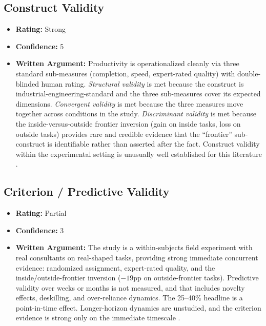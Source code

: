 \subsection{Construct Validity}
\begin{itemize}
    \item \textbf{Rating:} Strong
    \item \textbf{Confidence:} 5
    \item \textbf{Written Argument:} Productivity is operationalized cleanly via three standard sub-measures (completion, speed, expert-rated quality) with double-blinded human rating. \emph{Structural validity} is met because the construct is industrial-engineering-standard and the three sub-measures cover its expected dimensions. \emph{Convergent validity} is met because the three measures move together across conditions in the study. \emph{Discriminant validity} is met because the inside-versus-outside frontier inversion (gain on inside tasks, loss on outside tasks) provides rare and credible evidence that the ``frontier'' sub-construct is identifiable rather than asserted after the fact. Construct validity within the experimental setting is unusually well established for this literature \citep{salaudeen2025measurement}.
\end{itemize}

\subsection{Criterion / Predictive Validity}
\begin{itemize}
    \item \textbf{Rating:} Partial
    \item \textbf{Confidence:} 3
    \item \textbf{Written Argument:} The study is a within-subjects field experiment with real consultants on real-shaped tasks, providing strong immediate concurrent evidence: randomized assignment, expert-rated quality, and the inside/outside-frontier inversion ($-19$pp on outside-frontier tasks). Predictive validity over weeks or months is not measured, and that includes novelty effects, deskilling, and over-reliance dynamics. The 25--40\% headline is a point-in-time effect. Longer-horizon dynamics are unstudied, and the criterion evidence is strong only on the immediate timescale \citep{salaudeen2025measurement}.
\end{itemize}

